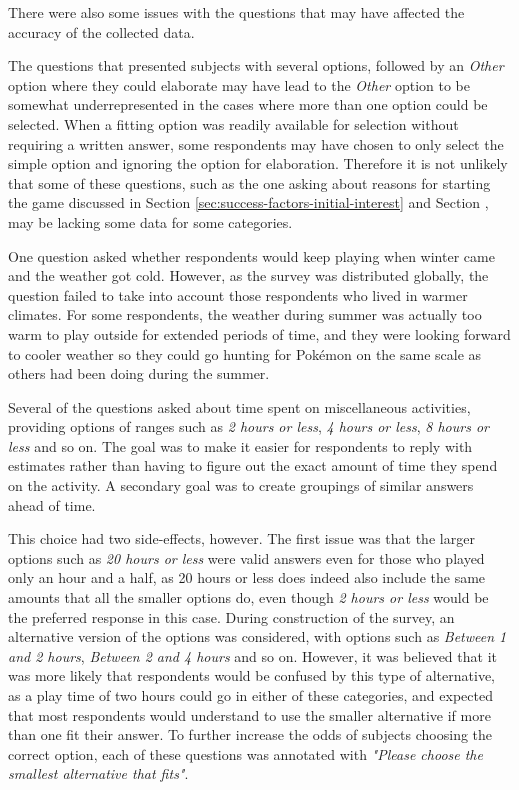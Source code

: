 There were also some issues with the questions that may have affected the accuracy of the collected data.

The questions that presented subjects with several options, followed by an \emph{Other} option where they could elaborate may have lead to the \emph{Other} option to be somewhat underrepresented in the cases where more than one option could be selected. When a fitting option was readily available for selection without requiring a written answer, some respondents may have chosen to only select the simple option and ignoring the option for elaboration. Therefore it is not unlikely that some of these questions, such as the one asking about reasons for starting the game discussed in Section \ref{sec:success-factors-initial-interest} and Section , may be lacking some data for some categories.

One question asked whether respondents would keep playing when winter came and the weather got cold. However, as the survey was distributed globally, the question failed to take into account those respondents who lived in warmer climates. For some respondents, the weather during summer was actually too warm to play outside for extended periods of time, and they were looking forward to cooler weather so they could go hunting for Pokémon on the same scale as others had been doing during the summer.

Several of the questions asked about time spent on miscellaneous activities, providing options of ranges such as \emph{2 hours or less}, \emph{4 hours or less}, \emph{8 hours or less} and so on. The goal was to make it easier for respondents to reply with estimates rather than having to figure out the exact amount of time they spend on the activity. A secondary goal was to create groupings of similar answers ahead of time.

This choice had two side-effects, however. The first issue was that the larger options such as \emph{20 hours or less} were valid answers even for those who played only an hour and a half, as 20 hours or less does indeed also include the same amounts that all the smaller options do, even though \emph{2 hours or less} would be the preferred response in this case. During construction of the survey, an alternative version of the options was considered, with options such as \emph{Between 1 and 2 hours}, \emph{Between 2 and 4 hours} and so on. However, it was believed that it was more likely that respondents would be confused by this type of alternative, as a play time of two hours could go in either of these categories, and expected that most respondents would understand to use the smaller alternative if more than one fit their answer. To further increase the odds of subjects choosing the correct option, each of these questions was annotated with \emph{"Please choose the smallest alternative that fits"}.

